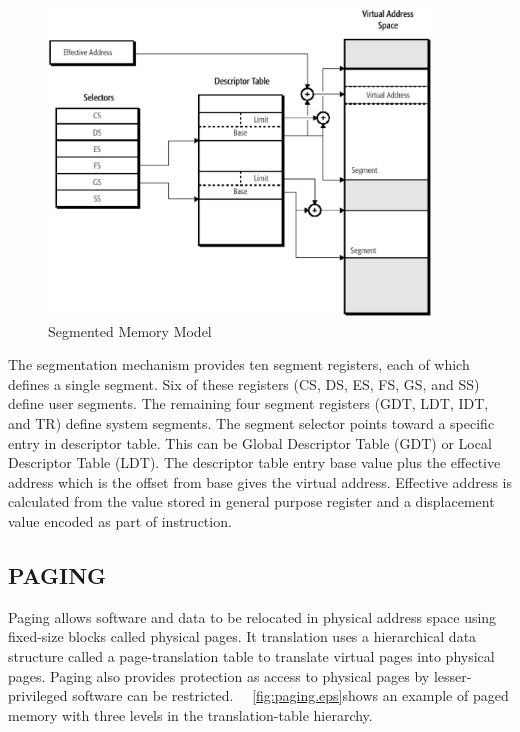 \begin{figure}[H]
\centering
\includegraphics[width=4in]{./figures/segmentation.eps}
\caption{Segmented Memory Model}
\label{fig:segmentation.eps}
\end{figure}


The segmentation mechanism provides ten segment registers, each of which defines a single segment. Six of these registers (CS, DS, ES, FS, GS, and SS) define user segments. The remaining four segment registers (GDT, LDT, IDT, and TR) define system segments. The segment selector points toward a specific entry in descriptor table. This can be Global Descriptor Table (GDT) or Local Descriptor Table (LDT). The descriptor table entry base value plus the effective address which is the offset from base gives the virtual address. Effective address is calculated from the value stored in general purpose register and a displacement value encoded as part of instruction.

\subsection{PAGING}
Paging allows software and data to be relocated in physical address space using fixed-size blocks called physical pages. It translation uses a hierarchical data structure called a page-translation table to translate virtual pages into physical pages. Paging also provides protection as access to physical pages by lesser-privileged software can be restricted. ~\figurename{~\ref{fig:paging.eps}}shows an example of paged memory with three levels in the translation-table hierarchy. 





